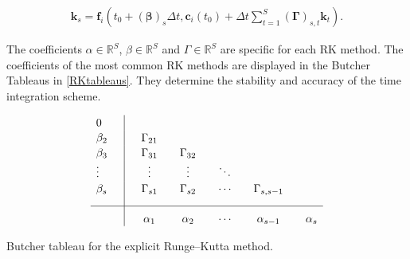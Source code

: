 	\begin{align}
		\mathbf{k}_s = \mathbf{f}_i \left( t_0 +(\mathbf{\beta})_s \Delta t, \mathbf{c}_i (t_0) + \Delta t \sum\limits_{t = 1}^{S}\boldsymbol{(\Gamma)}_{s,t}\mathbf{k}_t\right).
	\end{align}
	
	The coefficients $\alpha \in \mathbb{R}^S$, $\beta \in \mathbb{R}^S$ and $\Gamma \in \mathbb{R}^S$ are specific for each RK method. The coefficients of the most common RK methods are displayed in the Butcher Tableaus in \ref{RKtableaus}. They determine the stability and accuracy of the time integration scheme. \\
\begin{table}[h]
	\begin{equation*}
		\begin{array}{l | c c c c c}
			\rule{0pt}{2,3ex} 0      \quad &             &               &              &         &   \\
			\rule{0pt}{2,3ex} \beta_2    \quad & \quad \Gamma_{21}  &              &              &         &   \\
			\rule{0pt}{2,3ex} \beta_3    \quad & \quad \Gamma_{31}  & \quad \Gamma_{32}  &              &         &   \\
			\rule{0pt}{2,3ex} \vdots \quad & \quad \vdots & \quad \vdots & \quad \ddots &         &   \\
			\rule{0pt}{2,3ex} \beta_s    \quad & \quad \Gamma_{s1}  & \quad \Gamma_{s2}  & \quad \cdots & \quad \Gamma_{s,s-1} & \\[2,0ex] \hline
			\rule{0pt}{3,3ex}              & \quad \alpha_{1}  & \quad \alpha_{2}    & \quad \cdots & \quad \alpha_{s-1}  & \quad \alpha_{s}
		\end{array}
	\end{equation*}
	\caption{Butcher tableau for the explicit Runge–Kutta method.}
	\label{tab:RKexplicit}
\end{table}		

